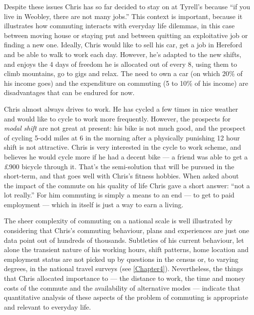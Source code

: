 Despite these issues Chris has so far
decided to stay on at Tyrell's because
``if you live in Weobley, there are not many jobs.''
This context is important, because it illustrates how commuting
interacts with everyday life dilemmas, in this case
between moving house or staying put and
between quitting an exploitative job or finding a new one.
Ideally, Chris would like to sell his car, get a job in Hereford and be able
to walk to work each day. However, he's adapted to the new shifts, and
enjoys the 4 days of freedom he is allocated out of every 8, using them
to climb mountains, go to gigs and relax. The need to own a car
(on which 20\% of his income goes) and the expenditure on commuting
(5 to 10\% of his income) are disadvantages that can be endured for now.

Chris almost always drives to work. He has cycled a few times in nice weather
and would like to cycle to work more frequently. However, the
prospects for \emph{modal shift} are not great at present: his bike is not
much good, and the prospect of cycling 5-odd miles at 6 in the morning
after a physically punishing 12 hour shift is not attractive.
Chris is very interested in the cycle to work scheme, and believes he
would cycle more if he had a decent bike --- a friend was able to
get a \pounds900 bicycle through it. That's the semi-solution that
will be pursued in the short-term, and that goes well with Chris's
fitness hobbies.
When asked about the impact of the commute on his quality of life
Chris gave a short answer: ``not a lot really.'' For him commuting
is simply a means to an end --- to get to paid employment --- which
in itself is just a way to earn a living.

The sheer complexity of commuting on a national scale is well illustrated
by considering that Chris's commuting behaviour, plans and experiences
are just one data point out of hundreds of thousands. Subtleties of
his current behaviour,
let alone the transient nature of his working
hours, shift patterns, home location and employment status are not
picked up by questions in the census or, to varying degrees, in the
national travel surveys (see \cref{Chapter4}). Nevertheless, the things that
Chris allocated importance to --- the distance to work, the time and money
costs of the commute and the availability of alternative modes --- indicate
that quantitative analysis of these aspects of the problem
of commuting is appropriate and relevant to everyday life.

